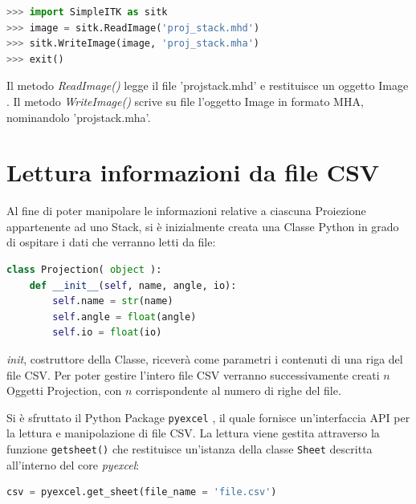 \documentclass[a4paper,12pt, doubleside]{report}
\begin{document}
                    \begin{lstlisting}[language=python, frame=bt]
>>> import SimpleITK as sitk
>>> image = sitk.ReadImage('proj_stack.mhd')
>>> sitk.WriteImage(image, 'proj_stack.mha')
>>> exit()
                    \end{lstlisting}
                    
                    Il metodo \textit{ReadImage()} legge il file 'proj\textunderscore stack.mhd' e restituisce un oggetto Image \cite{itk-image-object}. Il metodo \textit{WriteImage()} scrive su file l'oggetto Image in formato MHA, nominandolo 'proj\textunderscore stack.mha'. 
        
        \section{Lettura informazioni da file CSV}
            \label{sec:lettura-csv}
            
            \par
                Al fine di poter manipolare le informazioni relative a ciascuna Proiezione appartenente ad uno Stack, si è inizialmente creata una Classe Python in grado di ospitare i dati che verranno letti da file:
            
                \begin{lstlisting}[language=python, frame=bt]
class Projection( object ):
    def __init__(self, name, angle, io):
        self.name = str(name)
        self.angle = float(angle)
        self.io = float(io)
                \end{lstlisting}
            
               \textit{\textunderscore \textunderscore init\textunderscore \textunderscore}, costruttore della Classe, riceverà come parametri i contenuti di una riga del file CSV. Per poter gestire l'intero file CSV verranno successivamente creati $n$ Oggetti Projection, con $n$ corrispondente al numero di righe del file.
            
            \bigskip
            \par
                Si è sfruttato il Python Package \texttt{pyexcel} \cite{pyexcel}, il quale fornisce un'interfaccia API per la lettura e manipolazione di file CSV. La lettura viene gestita attraverso la funzione \texttt{get\textunderscore sheet()} che restituisce un'istanza della classe \texttt{Sheet} descritta all'interno del core \textit{pyexcel}:
                
                \begin{lstlisting}[language=python, frame=bt]
csv = pyexcel.get_sheet(file_name = 'file.csv')
                \end{lstlisting}
            
\end{document}
